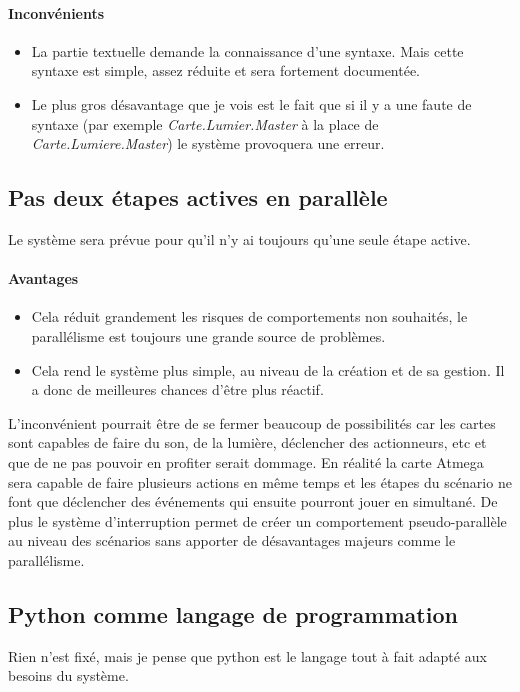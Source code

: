 \paragraph{Inconvénients}
\begin{itemize}
\item La partie textuelle demande la connaissance d'une syntaxe. Mais cette syntaxe est simple, assez réduite et sera fortement documentée.
\item Le plus gros désavantage que je vois est le fait que si il y a une faute de syntaxe (par exemple \textit{Carte.Lumier.Master} à la place de \textit{Carte.Lumiere.Master}) le système provoquera une erreur.
\end{itemize}

\subsection{Pas deux étapes actives en parallèle}
Le système sera prévue pour qu'il n'y ai toujours qu'une seule étape active.
\paragraph{Avantages}
\begin{itemize}
\item Cela réduit grandement les risques de comportements non souhaités, le parallélisme est toujours une grande source de problèmes.
\item Cela rend le système plus simple, au niveau de la création et de sa gestion. Il a donc de meilleures chances d'être plus réactif.
\end{itemize}
L'inconvénient pourrait être de se fermer beaucoup de possibilités car les cartes sont capables de faire du son, de la lumière, déclencher des actionneurs, etc et que de ne pas pouvoir en profiter serait dommage.\p
En réalité la carte Atmega sera capable de faire plusieurs actions en même temps et les étapes du scénario ne font que déclencher des événements qui ensuite pourront jouer en simultané. De plus le système d'interruption permet de créer un comportement pseudo-parallèle  au niveau des scénarios sans apporter de désavantages majeurs comme le parallélisme.

\subsection{Python comme langage de programmation}
Rien n'est fixé, mais je pense que python est le langage tout à fait adapté aux besoins du système.
